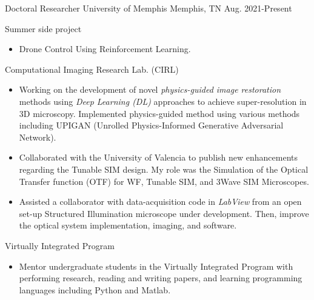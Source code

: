 

\begin{cventries}

  \cventry
    {Doctoral Researcher} %
    {University of Memphis} %
    {Memphis, TN} %
    {Aug. 2021-Present} %
    {
      \begin{cvitems} %
      \item{Summer side project}
      \begin{itemize}[label= - ]
                \item Drone Control Using Reinforcement Learning.
        \end{itemize}   
      \item{Computational Imaging Research Lab. (CIRL)}
      \begin{itemize}[label= - ]
                \item{Working on the development of novel \textit{physics-guided image restoration} methods using \textit{Deep Learning (DL)} approaches to achieve super-resolution in 3D microscopy. Implemented physics-guided method using various methods including UPIGAN (Unrolled Physics-Informed Generative Adversarial Network).}
              \item{Collaborated with the University of Valencia to publish new enhancements regarding the Tunable SIM design. My role was the Simulation of the Optical Transfer function (OTF) for WF, Tunable SIM, and 3Wave SIM Microscopes.}
              \item{Assisted a collaborator with data-acquisition code in \textit{LabView} from an open set-up Structured Illumination microscope under development. Then, improve the optical system implementation, imaging, and software.}
        \end{itemize}    
        \item{Virtually Integrated Program}
        \begin{itemize}
              \item {Mentor undergraduate students in the Virtually Integrated Program with performing research, reading and writing papers, and learning programming languages including Python and Matlab.}

\end{itemize}
\end{cvitems}}
\end{cventries}
